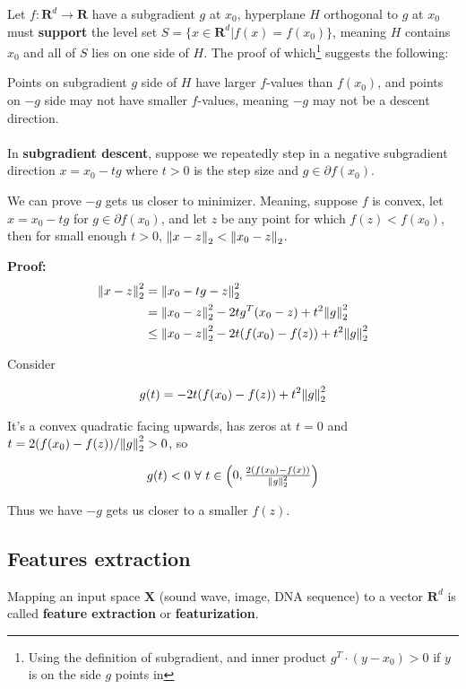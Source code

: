 \documentclass{article}
\begin{document}
Let $f : \mathbf{R}^d \to \mathbf{R}$ have a subgradient $g$ at $x_0$, hyperplane $H$ orthogonal to $g$ at $x_0$ must \textbf{support} the level set $S = \{ x \in \mathbf{R}^d | f(x) = f(x_0) \}$, meaning $H$ contains $x_0$ and all of $S$ lies on one side of $H$.
The proof of which\footnote{Using the definition of subgradient, and inner product $g^T \cdot (y - x_0) > 0$ if $y$ is on the side $g$ points in} suggests the following:

Points on subgradient $g$ side of $H$ have larger $f$-values than $f(x_0)$, and points on $-g$ side may not have smaller $f$-values, meaning $-g$ may not be a descent direction.
\\
\\
In \textbf{subgradient descent}, suppose we repeatedly step in a negative subgradient direction $x = x_0 - t g$ where $t > 0$ is the step size and $g \in \partial f(x_0)$.

We can prove $-g$ gets us closer to minimizer.
Meaning, suppose $f$ is convex, let $x = x_0 - t g$ for $g \in \partial f(x_0)$, and let $z$ be any point for which $f(z) < f(x_0)$, then for small enough $t > 0$, $\norm{x - z}_2 < \norm{x_0 - z}_2$.

\textbf{Proof:}
\begin{align*}
\norm{x - z}_2^2 &= \norm{x_0 - tg - z}_2^2 \\
                 &= \norm{x_0 - z}_2^2 - 2 t g^T (x_0 - z) + t^2 \norm{g}_2^2 \\
                 &\leq \norm{x_0 - z}_2^2 - 2 t (f(x_0) - f(z)) + t^2 \norm{g}_2^2
\end{align*}

Consider

$$
g(t) = - 2 t (f(x_0) - f(z)) + t^2 \norm{g}_2^2
$$

It's a convex quadratic facing upwards, has zeros at $t = 0$ and $t = 2 (f(x_0) - f(z)) / \norm{g}_2^2 > 0$, so

$$
g(t) < 0 ~\forall ~ t \in \begin{pmatrix} 0, \frac{2 (f(x_0) - f(x))}{\norm{g}_2^2} \end{pmatrix}
$$

Thus we have $-g$ gets us closer to a smaller $f(z)$.

\subsection{Features extraction}

Mapping an input space $\mathbf{X}$ (sound wave, image, DNA sequence) to a vector $\mathbf{R}^d$ is called \textbf{feature extraction} or \textbf{featurization}.
\end{document}
